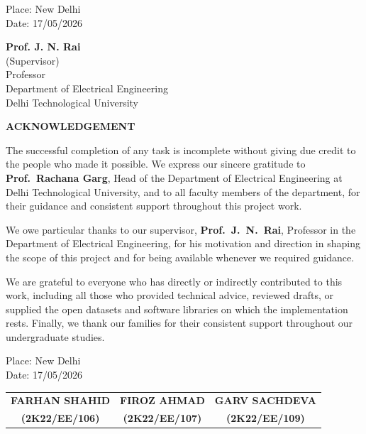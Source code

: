 \documentclass[12pt,a4paper,openany]{report}
\begin{document}
\vspace{30pt}
\begin{minipage}[t]{0.45\textwidth}
Place: New Delhi\\[2pt]
Date: 17/05/2026
\end{minipage}\hfill
\begin{minipage}[t]{0.45\textwidth}
\raggedleft
\textbf{Prof. J. N. Rai}\\[2pt]
(Supervisor)\\[2pt]
Professor\\[2pt]
Department of Electrical Engineering\\[2pt]
Delhi Technological University
\end{minipage}

\newpage

\begin{center}
\textbf{ACKNOWLEDGEMENT}
\end{center}
\vspace{10pt}

The successful completion of any task is incomplete without giving due credit to the people who made it possible. We express our sincere gratitude to \textbf{Prof.~Rachana Garg}, Head of the Department of Electrical Engineering at Delhi Technological University, and to all faculty members of the department, for their guidance and consistent support throughout this project work.

We owe particular thanks to our supervisor, \textbf{Prof.~J.~N.~Rai}, Professor in the Department of Electrical Engineering, for his motivation and direction in shaping the scope of this project and for being available whenever we required guidance.

We are grateful to everyone who has directly or indirectly contributed to this work, including all those who provided technical advice, reviewed drafts, or supplied the open datasets and software libraries on which the implementation rests. Finally, we thank our families for their consistent support throughout our undergraduate studies.

\vspace{40pt}
\noindent\begin{minipage}[t]{0.22\textwidth}
Place: New Delhi\\[2pt]
Date: 17/05/2026
\end{minipage}\hfill
\begin{minipage}[t]{0.76\textwidth}
\centering
\begin{tabular}{ccc}
\textbf{FARHAN SHAHID} & \textbf{FIROZ AHMAD} & \textbf{GARV SACHDEVA} \\
\textbf{(2K22/EE/106)} & \textbf{(2K22/EE/107)} & \textbf{(2K22/EE/109)}
\end{tabular}
\end{minipage}
\end{document}
